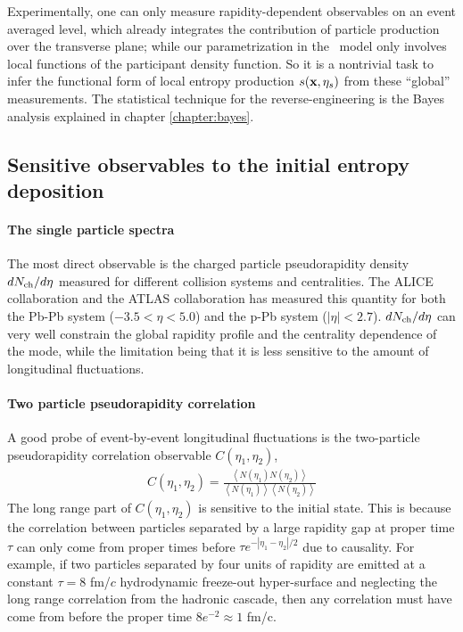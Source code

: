 Experimentally, one can only measure rapidity-dependent observables on an event averaged level, which already integrates the contribution of particle production over the transverse plane; while our parametrization in the \trento\ model only involves local functions of the participant density function.
So it is a nontrivial task to infer the functional form of local entropy production $s(\mathbf x, \eta_s)$ from these ``global'' measurements.
The statistical technique for the reverse-engineering is the Bayes analysis explained in chapter \ref{chapter:bayes}.

\subsection{Sensitive observables to the initial entropy deposition}
\paragraph{The single particle spectra}
The most direct observable is the charged particle pseudorapidity density $dN_\text{ch}/d\eta$ measured for different collision systems and centralities.
The ALICE collaboration and the ATLAS collaboration has measured this quantity for both the Pb-Pb system ($-3.5<\eta<5.0$) and the p-Pb system ($|\eta| < 2.7$).
$dN_\text{ch}/d\eta$ can very well constrain the global rapidity profile and the centrality dependence of the mode, while the limitation being that it is less sensitive to the amount of longitudinal fluctuations.

\paragraph{Two particle pseudorapidity correlation}
A good probe of event-by-event longitudinal fluctuations is the two-particle pseudorapidity correlation observable $C(\eta_1, \eta_2)$,
\begin{eqnarray}
C(\eta_1, \eta_2) = \frac{ \left\langle N(\eta_1)N(\eta_2) \right\rangle}{\left\langle N(\eta_1)\right\rangle\left\langle N(\eta_2) \right\rangle}
\end{eqnarray}
The long range part of $C(\eta_1, \eta_2)$ is sensitive to the initial state.
This is because the correlation between particles separated by a large rapidity gap at proper time $\tau$ can only come from proper times before $\tau e^{-|\eta_1-\eta_2|/2}$ due to causality.
For example, if two particles separated by four units of rapidity are emitted at a constant $\tau = 8$ fm/$c$ hydrodynamic freeze-out hyper-surface and neglecting the long range correlation from the hadronic cascade, then any correlation must have come from before the proper time $ 8 e^{-2}\approx 1$ fm/c.

